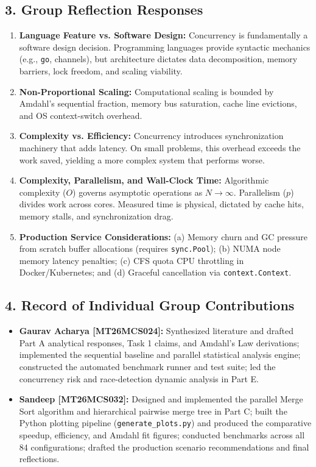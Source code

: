 \documentclass[11pt]{article}
\begin{document}
\subsection*{3. Group Reflection Responses}
\begin{enumerate}[itemsep=0.25em]
    \item \textbf{Language Feature vs. Software Design:} Concurrency is fundamentally a software design decision. Programming languages provide syntactic mechanics (e.g., \texttt{go}, channels), but architecture dictates data decomposition, memory barriers, lock freedom, and scaling viability.
    \item \textbf{Non-Proportional Scaling:} Computational scaling is bounded by Amdahl's sequential fraction, memory bus saturation, cache line evictions, and OS context-switch overhead.
    \item \textbf{Complexity vs. Efficiency:} Concurrency introduces synchronization machinery that adds latency. On small problems, this overhead exceeds the work saved, yielding a more complex system that performs worse.
    \item \textbf{Complexity, Parallelism, and Wall-Clock Time:} Algorithmic complexity ($O$) governs asymptotic operations as $N \to \infty$. Parallelism ($p$) divides work across cores. Measured time is physical, dictated by cache hits, memory stalls, and synchronization drag.
    \item \textbf{Production Service Considerations:} (a) Memory churn and GC pressure from scratch buffer allocations (requires \texttt{sync.Pool}); (b) NUMA node memory latency penalties; (c) CFS quota CPU throttling in Docker/Kubernetes; and (d) Graceful cancellation via \texttt{context.Context}.
\end{enumerate}

\subsection*{4. Record of Individual Group Contributions}
\begin{itemize}[itemsep=0.1em]
    \item \textbf{Gaurav Acharya [MT26MCS024]:} Synthesized literature and drafted Part A analytical responses, Task 1 claims, and Amdahl's Law derivations; implemented the sequential baseline and parallel statistical analysis engine; constructed the automated benchmark runner and test suite; led the concurrency risk and race-detection dynamic analysis in Part E.
    \item \textbf{Sandeep [MT26MCS032]:} Designed and implemented the parallel Merge Sort algorithm and hierarchical pairwise merge tree in Part C; built the Python plotting pipeline (\texttt{generate\_plots.py}) and produced the comparative speedup, efficiency, and Amdahl fit figures; conducted benchmarks across all 84 configurations; drafted the production scenario recommendations and final reflections.
\end{itemize}
\end{document}
